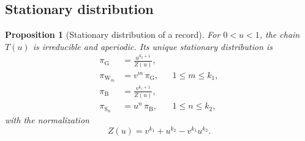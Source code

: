 \documentclass[10pt]{wlscirep}
\newcommand{\st}[1]{\mathrm{#1}}           %
\theoremstyle{plain}
\newtheorem{proposition}[lemma]{Proposition}
\theoremstyle{remark}
\begin{document}
\subsection{Stationary distribution}

\begin{proposition}[Stationary distribution of a record]\label{prop:stationary}
For $0<u<1$, the chain $T(u)$ is irreducible and aperiodic. Its unique stationary distribution is
\begin{equation}
\begin{aligned}
\pi_{\st G}&=\frac{u^{k_2+1}}{Z(u)},\\[2pt]
\pi_{\st W_m}&=v^{m}\,\pi_{\st G}, && 1\leq m\leq k_1,\\[2pt]
\pi_{\st B}&=\frac{v^{k_1+1}}{Z(u)},\\[2pt]
\pi_{\st S_n}&=u^{n}\,\pi_{\st B}, && 1\leq n\leq k_2,
\end{aligned}
\label{eq:s-stationary}
\end{equation}
with the normalization
\begin{equation}
Z(u)=v^{k_1}+u^{k_2}-v^{k_1}u^{k_2}.
\label{eq:s-Z}
\end{equation}
\end{proposition}
\end{document}
